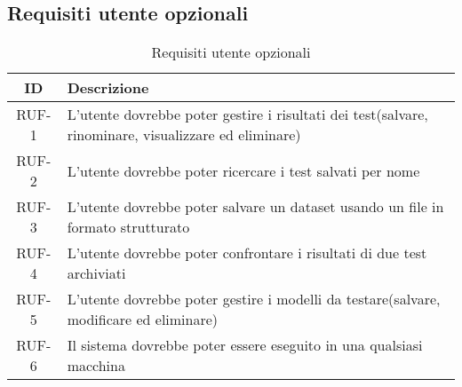 \subsection{Requisiti utente opzionali}
\begin{table}[H]
    \begin{tabularx}{\textwidth}{|c|X|}
        \hline
        \textbf{ID} & \textbf{Descrizione} \\ 
        \hline
        \label{ru:RUF-1} RUF-1 &  L'utente dovrebbe poter gestire i risultati dei test(salvare, rinominare, visualizzare ed eliminare)\\ 
        \hline
        \label{ru:RUF-2} RUF-2 & L'utente dovrebbe poter ricercare i test salvati per nome \\ 
        \hline
        \label{ru:RUF-3} RUF-3 & L'utente dovrebbe poter salvare un dataset usando un file in formato strutturato \\ 
        \hline
        \label{ru:RUF-4} RUF-4 & L'utente dovrebbe poter confrontare i risultati di due test archiviati \\ 
        \hline
        \label{ru:RUF-5} RUF-5 & L'utente dovrebbe poter gestire i modelli da testare(salvare, modificare ed eliminare)\\ \hline
        \label{ru:RUF-6} RUF-6 & Il sistema dovrebbe poter essere eseguito in una qualsiasi macchina\\ 
        \hline
    \end{tabularx}
    \vspace{10px}
    \caption{Requisiti utente opzionali}
\end{table}